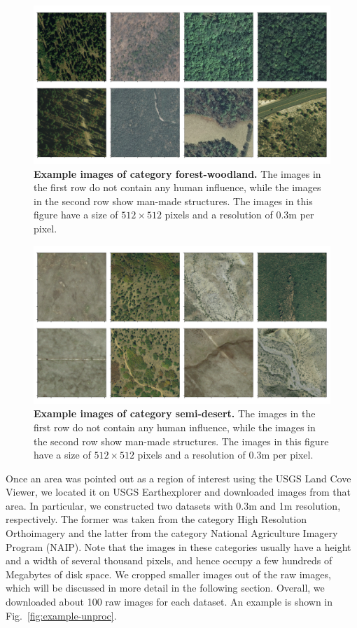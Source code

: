 \begin{figure}[h!]
	\centering
	\captionsetup{width=1\linewidth}
	\includegraphics[width=1\textwidth]{Figures/forest-woodland_sample.pdf}
	\caption{\textbf{Example images of category forest-woodland.} The images in the first row do not contain any human influence, while the images in the second row show man-made structures. The images in this figure have a size of $512\times512$ pixels and a resolution of $0.3$m per pixel.}
	\label{fig:forest-sample}
\end{figure}

\begin{figure}[h!]
	\centering
	\captionsetup{width=1\linewidth}
	\includegraphics[width=1\textwidth]{Figures/semi-desert_sample.pdf}
	\caption{\textbf{Example images of category semi-desert.} The images in the first row do not contain any human influence, while the images in the second row show man-made structures. The images in this figure have a size of $512\times512$ pixels and a resolution of $0.3$m per pixel.}
	\label{fig:desert-sample}
\end{figure}

Once an area was pointed out as a region of interest using the USGS Land Cove Viewer, we located it on USGS Earthexplorer and downloaded images from that area. In particular, we constructed two datasets with 0.3m and 1m resolution, respectively. The former was taken from the category High Resolution Orthoimagery and the latter from the category National Agriculture Imagery Program (NAIP). Note that the images in these categories usually have a height and a width of several thousand pixels, and hence occupy a few hundreds of Megabytes of disk space. We cropped smaller images out of the raw images, which will be discussed in more detail in the following section. Overall, we downloaded about 100 raw images for each dataset. An example is shown in Fig.~\ref{fig:example-unproc}.


